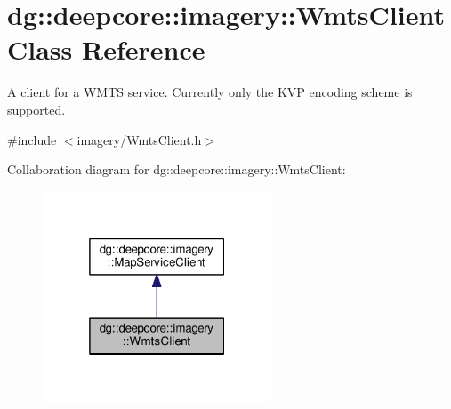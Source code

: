 \hypertarget{classdg_1_1deepcore_1_1imagery_1_1_wmts_client}{}\section{dg\+:\+:deepcore\+:\+:imagery\+:\+:Wmts\+Client Class Reference}
\label{classdg_1_1deepcore_1_1imagery_1_1_wmts_client}


A client for a W\+M\+TS service. Currently only the K\+VP encoding scheme is supported.  




{\ttfamily \#include $<$imagery/\+Wmts\+Client.\+h$>$}



Collaboration diagram for dg\+:\+:deepcore\+:\+:imagery\+:\+:Wmts\+Client\+:
\nopagebreak
\begin{figure}[H]
\begin{center}
\leavevmode
\includegraphics[width=193pt]{classdg_1_1deepcore_1_1imagery_1_1_wmts_client__coll__graph}
\end{center}
\end{figure}
